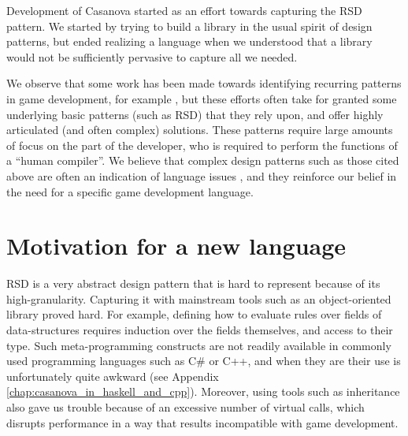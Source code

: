 Development of Casanova started as an effort towards capturing the RSD pattern. We started by trying to build a library in the usual spirit of design patterns, but ended realizing a language when we understood that a library would not be sufficiently pervasive to capture all we needed.
 
We observe that some work has been made towards identifying recurring patterns in game development, for example \cite{bjork2005patterns, stoy2006components}, but these efforts often take for granted some underlying basic patterns (such as RSD) that they rely upon, and offer highly articulated (and often complex) solutions. These patterns require large amounts of focus on the part of the developer, who is required to perform the functions of a ``human compiler''. We believe that complex design patterns such as those cited above are often an indication of language issues \cite{Sullivan02advancedprogramming}, and they reinforce our belief in the need for a specific game development language.


\section{Motivation for a new language}
RSD is a very abstract design pattern that is hard to represent because of its high-granularity. Capturing it with mainstream tools such as an object-oriented library proved hard. For example, defining how to evaluate rules over fields of data-structures requires induction over the fields themselves, and access to their type. Such meta-programming constructs are not readily available in commonly used programming languages such as C\# or C++, and when they are their use is unfortunately quite awkward (see Appendix \ref{chap:casanova_in_haskell_and_cpp}). Moreover, using tools such as inheritance also gave us trouble because of an excessive number of virtual calls, which disrupts performance in a way that results incompatible with game development.

